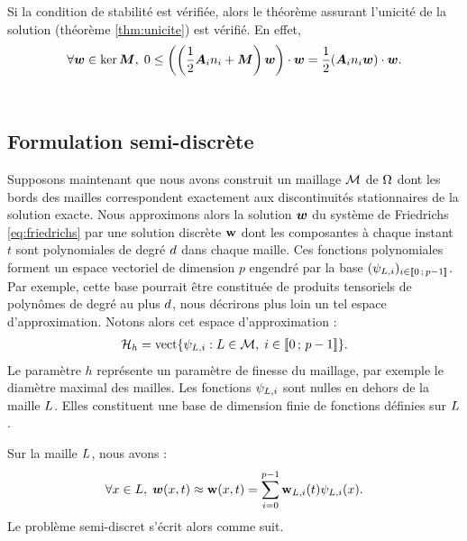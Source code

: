 \begin{remark}
	Si la condition de stabilité est vérifiée, alors le théorème assurant l’unicité
	de la solution (théorème \ref{thm:unicite}) est vérifié. En effet,
	\begin{align}
		\forall \bm{w} \in \ker \bm{M}, \;
		0 \le \left( \left( \frac{1}{2} {\bm{A}_{i}n_{i}} + \bm{M} \right) \bm{w} \right) \cdot \bm{w}
		= \frac{1}{2} ({\bm{A}_{i}n_{i}} \bm{w}) \cdot \bm{w} .
	\end{align}
	\\
\end{remark}


\subsection{Formulation semi-discrète}
\label{ssect:formulation_semi-discrete}


Supposons maintenant que nous avons construit un maillage $\mathcal{M}$ de $\Omega$
dont les bords des mailles correspondent exactement aux discontinuités stationnaires
de la solution exacte. Nous approximons alors la solution $\bm{w}$ du système de
Friedrichs \eqref{eq:friedrichs} par une solution discrète $\bm{\mathrm{w}}$ dont les composantes
à chaque instant $t$ sont polynomiales de degré $d$ dans chaque maille.
Ces fonctions polynomiales forment un espace vectoriel de dimension $p$ engendré par la base
$(\psi_{L,i})_{i \in \lbrack\!\lbrack0\,;\,p-1\rbrack\!\rbrack}$.
Par exemple, cette base pourrait être constituée de produits tensoriels de polynômes
de degré au plus $d$, nous décrirons plus loin un tel espace d’approximation. Notons
alors cet espace d’approximation :
\begin{align} \label{eq:ev_solution_discrete}
	\mathcal{H}_h = \mathrm{vect} \lbrace
		\psi_{L,i} : L \in \mathcal{M}, \; i \in \lbrack\!\lbrack0\,;\,p-1\rbrack\!\rbrack
	\rbrace .
\end{align}
Le paramètre $h$ représente un paramètre de finesse du maillage, par exemple
le diamètre maximal des mailles. Les fonctions $\psi_{L,i}$ sont nulles
en dehors de la maille $L$. Elles constituent une base de dimension finie
de fonctions définies sur $L$.

Sur la maille $L$, nous avons :
\begin{align}
	\forall x \in L, \;
	\bm{w}(x,t) \approx \bm{\mathrm{w}}(x,t) = \sum_{i=0}^{p-1} \bm{\mathrm{w}}_{L,i}(t) \psi_{L,i}(x) .
\end{align}
Le problème semi-discret s’écrit alors comme suit.

